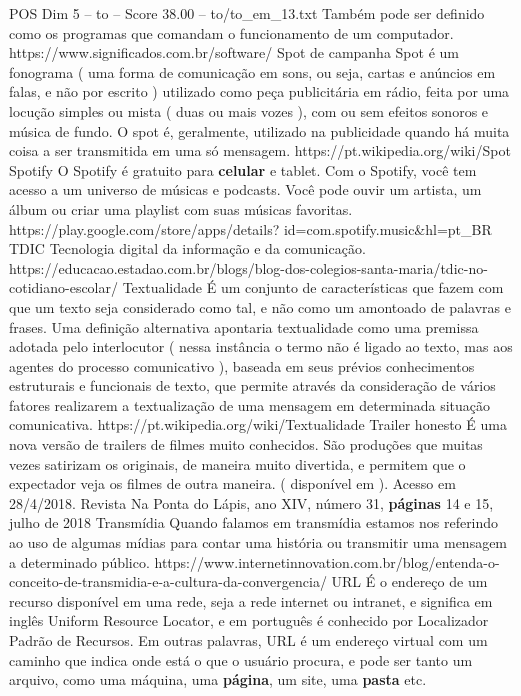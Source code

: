 \begin{textsample}{POS Dim 5 – to – Score 38.00 – to/to\_em\_13.txt}
Também pode ser definido como os programas que comandam o funcionamento de um computador. https://www.significados.com.br/software/ Spot de campanha Spot é um fonograma ( uma forma de comunicação em sons, ou seja, cartas e anúncios em falas, e não por escrito ) utilizado como peça publicitária em rádio, feita por uma locução simples ou mista ( duas ou mais vozes ), com ou sem efeitos sonoros e música de fundo.
O spot é, geralmente, utilizado na publicidade quando há muita coisa a ser transmitida em uma só mensagem. https://pt.wikipedia.org/wiki/Spot Spotify O Spotify é gratuito para \textbf{celular} e tablet.
Com o Spotify, você tem acesso a um universo de músicas e podcasts.
Você pode ouvir um artista, um álbum ou criar uma playlist com suas músicas favoritas. https://play.google.com/store/apps/details? id=com.spotify.music\&hl=pt\_BR TDIC Tecnologia digital da informação e da comunicação. https://educacao.estadao.com.br/blogs/blog-dos-colegios-santa-maria/tdic-no-cotidiano-escolar/ Textualidade É um conjunto de características que fazem com que um texto seja considerado como tal, e não como um amontoado de palavras e frases.
Uma definição alternativa apontaria textualidade como uma premissa adotada pelo interlocutor ( nessa instância o termo não é ligado ao texto, mas aos agentes do processo comunicativo ), baseada em seus prévios conhecimentos estruturais e funcionais de texto, que permite através da consideração de vários fatores realizarem a textualização de uma mensagem em determinada situação comunicativa. https://pt.wikipedia.org/wiki/Textualidade Trailer honesto É uma nova versão de trailers de filmes muito conhecidos.
São produções que muitas vezes satirizam os originais, de maneira muito divertida, e permitem que o expectador veja os filmes de outra maneira. ( disponível em ).
Acesso em 28/4/2018.
Revista Na Ponta do Lápis, ano XIV, número 31, \textbf{páginas} 14 e 15, julho de 2018 Transmídia Quando falamos em transmídia estamos nos referindo ao uso de algumas mídias para contar uma história ou transmitir uma mensagem a determinado público. https://www.internetinnovation.com.br/blog/entenda-o-conceito-de-transmidia-e-a-cultura-da-convergencia/ URL É o endereço de um recurso disponível em uma rede, seja a rede internet ou intranet, e significa em inglês Uniform Resource Locator, e em português é conhecido por Localizador Padrão de Recursos.
Em outras palavras, URL é um endereço virtual com um caminho que indica onde está o que o usuário procura, e pode ser tanto um arquivo, como uma máquina, uma \textbf{página}, um site, uma \textbf{pasta} etc.

\end{textsample}
